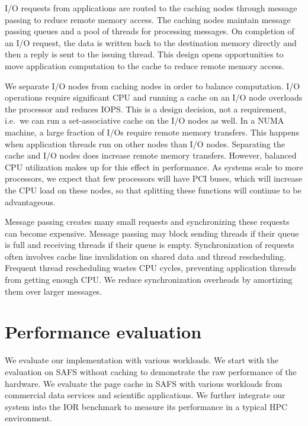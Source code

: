 I/O requests from applications are routed to the caching nodes through
message passing to reduce remote memory access. The caching nodes maintain
message passing queues and
a pool of threads for processing messages.
On completion of an I/O request, the data is written back to
the destination memory directly and then a reply is sent to the issuing thread.
This design opens opportunities to move application computation to the cache
to reduce remote memory access.

We separate I/O nodes from caching nodes in order to balance computation.
I/O operations require significant CPU and running a cache on an I/O node
overloads the processor and reduces IOPS.  This is a design decision, not a
requirement, i.e.~we can run a set-associative cache on the I/O nodes as well.
In a NUMA machine, a large fraction of I/Os require remote memory transfers.  
This happens when application threads run on other nodes than I/O nodes.
Separating the cache and I/O nodes does increase remote memory transfers.
However, balanced CPU utilization makes up for this effect in performance.
As systems scale to more processors, we expect that
few processors will have PCI buses, which will increase the CPU load on these nodes,
so that splitting these functions will continue to be advantageous.

Message passing creates many small requests and synchronizing these requests
can become expensive.
Message passing may block sending
threads if their queue is full and receiving threads if their queue is empty.
Synchronization of requests often involves 
cache line invalidation on shared data and thread rescheduling. 
Frequent thread rescheduling wastes CPU cycles, preventing application threads 
from getting enough CPU.  
We reduce synchronization overheads by amortizing them over larger messages.

\section{Performance evaluation}
We evaluate our implementation with various workloads. We start with the
evaluation on SAFS without caching to demonstrate the raw performance of
the hardware. We evaluate the page cache in SAFS
with various workloads from commercial data services and scientific
applications. We further integrate our system into the IOR benchmark \cite{IOR}
to measure its performance in a typical HPC environment.


